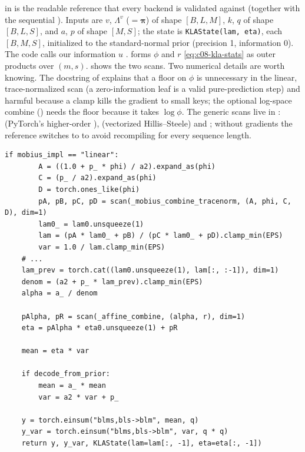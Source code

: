 \begin{implnote}[title={In the code: the reference scan}]
 in 
is the readable reference that every backend is validated against (together with the sequential
). Inputs are $v$, $\Lambda^v$ ($=\bm{\pi}$) of shape $[B,L,M]$, $k$,
$q$ of shape $[B,L,S]$, and $a$, $p$ of shape $[M,S]$; the state is \texttt{KLAState(lam,~eta)},
each $[B,M,S]$, initialized to the standard-normal prior (precision 1, information 0). The code
calls our information $u$ .  forms $\phi$ and $r$
\eqref{eq:c08-kla-stats} as outer products over $(m,s)$.  shows the two scans.
Two numerical details are worth knowing. The docstring of  explains that a
floor on $\phi$ is unnecessary in the linear, trace-normalized scan (a zero-information leaf is a
valid pure-prediction step) and harmful because a clamp kills the gradient to small keys; the
optional log-space combine () needs the floor because it takes $\log\phi$.
The generic scans live in :
 (PyTorch's higher-order ),  (vectorized
Hillis--Steele) and ; without gradients the reference switches to 
to avoid recompiling for every sequence length.
\end{implnote}

\begin{lstlisting}[caption={Excerpt from \texttt{repos/\allowbreak vaisakh-shaj\_\_kalman-linear-attention/\allowbreak src/\allowbreak kla/\allowbreak ops/\allowbreak kla\_ops.py} (function \texttt{kla\_scan\_torch}).},label={lst:c08-kla-ops}]
    if mobius_impl == "linear":
        A = ((1.0 + p_ * phi) / a2).expand_as(phi)
        C = (p_ / a2).expand_as(phi)
        D = torch.ones_like(phi)
        pA, pB, pC, pD = scan(_mobius_combine_tracenorm, (A, phi, C, D), dim=1)
        lam0_ = lam0.unsqueeze(1)
        lam = (pA * lam0_ + pB) / (pC * lam0_ + pD).clamp_min(EPS)
        var = 1.0 / lam.clamp_min(EPS)
    # ...
    lam_prev = torch.cat((lam0.unsqueeze(1), lam[:, :-1]), dim=1)
    denom = (a2 + p_ * lam_prev).clamp_min(EPS)
    alpha = a_ / denom

    pAlpha, pR = scan(_affine_combine, (alpha, r), dim=1)
    eta = pAlpha * eta0.unsqueeze(1) + pR

    mean = eta * var

    if decode_from_prior:
        mean = a_ * mean
        var = a2 * var + p_

    y = torch.einsum("blms,bls->blm", mean, q)
    y_var = torch.einsum("blms,bls->blm", var, q * q)
    return y, y_var, KLAState(lam=lam[:, -1], eta=eta[:, -1])
\end{lstlisting}

